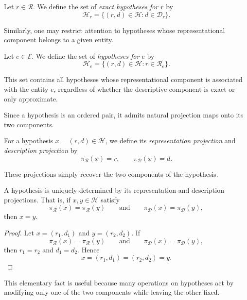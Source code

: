 \begin{definition}
\label{def:exact_hypotheses_for_representation}
Let \(r \in \mathcal{R}\). We define the set of \emph{exact hypotheses for \(r\)} by
\[
\mathcal{H}_r
=
\{ (r,d) \in \mathcal{H} : d \in \mathcal{D}_r \}.
\]
\end{definition}

Similarly, one may restrict attention to hypotheses whose representational component belongs to a given entity.

\begin{definition}
\label{def:hypotheses_for_entity}
Let \(e \in \mathcal{E}\). We define the set of \emph{hypotheses for \(e\)} by
\[
\mathcal{H}_e
=
\{ (r,d) \in \mathcal{H} : r \in \mathcal{R}_e \}.
\]
\end{definition}

This set contains all hypotheses whose representational component is associated with the entity \(e\), regardless of whether the descriptive component is exact or only approximate.

Since a hypothesis is an ordered pair, it admits natural projection maps onto its two components.

\begin{definition}
\label{def:hypothesis_projections}
For a hypothesis \(x=(r,d)\in\mathcal{H}\), we define its \emph{representation projection} and \emph{description projection} by
\[
\pi_{\mathcal{R}}(x)=r,
\qquad
\pi_{\mathcal{D}}(x)=d.
\]
\end{definition}

These projections simply recover the two components of the hypothesis.

\begin{proposition}
\label{prop:hypothesis_determined_by_components}
A hypothesis is uniquely determined by its representation and description projections. That is, if \(x,y\in\mathcal{H}\) satisfy
\[
\pi_{\mathcal{R}}(x)=\pi_{\mathcal{R}}(y)
\qquad\text{and}\qquad
\pi_{\mathcal{D}}(x)=\pi_{\mathcal{D}}(y),
\]
then \(x=y\).
\end{proposition}

\begin{proof}
Let \(x=(r_1,d_1)\) and \(y=(r_2,d_2)\). If
\[
\pi_{\mathcal{R}}(x)=\pi_{\mathcal{R}}(y)
\qquad\text{and}\qquad
\pi_{\mathcal{D}}(x)=\pi_{\mathcal{D}}(y),
\]
then \(r_1=r_2\) and \(d_1=d_2\). Hence
\[
x=(r_1,d_1)=(r_2,d_2)=y.
\]
\end{proof}

This elementary fact is useful because many operations on hypotheses act by modifying only one of the two components while leaving the other fixed.

